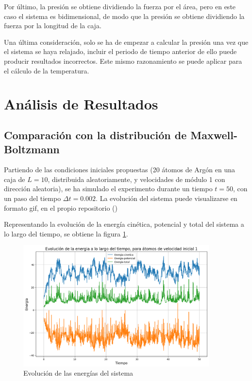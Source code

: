 \documentclass[11pt, twoside]{article} %
\begin{document}
Por último, la presión se obtiene dividiendo la fuerza por el área, pero en este caso
el sistema es bidimensional, de modo que la presión se obtiene dividiendo la fuerza
por la longitud de la caja.

Una última consideración, solo se ha de empezar a calcular la presión una vez que el
sistema se haya relajado, incluir el periodo de tiempo anterior de ello puede producir
resultados incorrectos. Este mismo razonamiento se puede aplicar para el cálculo de
la temperatura.

\newpage

\section{Análisis de Resultados}

\subsection{Comparación con la distribución de Maxwell-Boltzmann}

Partiendo de las condiciones iniciales propuestas (20 átomos de Argón en una caja 
de $L=10$, distribuida aleatoriamente, y velocidades de módulo 1 con dirección aleatoria), se ha simulado el
experimento durante un tiempo $t = 50$, con un paso del tiempo 
$\Delta t = 0.002$. La evolución del sistema puede visualizarse en formato gif, 
en el propio repositorio ()

Representando la evolución de la energía cinética, potencial y total del sistema
a lo largo del tiempo, se obtiene la figura \ref{fig:energias}.

\begin{figure}[h!]
    \centering
    \includegraphics[width=0.9\textwidth]{plots/apartado_1_energia_1.png}
    \caption{Evolución de las energías del sistema}
    \label{fig:energias}
\end{figure}
\end{document}
